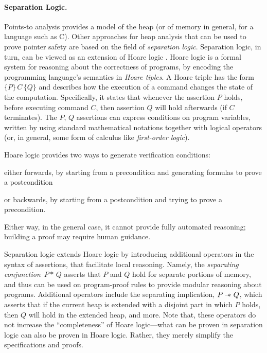 
\paragraph{Separation Logic.}
Points-to analysis provides a model of the heap (or of memory in
general, for a language such as C). Other approaches for heap analysis
that can be used to prove pointer safety are based on the field of
\emph{separation logic}. Separation logic, in turn, can be viewed as
an extension of Hoare logic
\cite{journals/cacm/Hoare69,floyd1967assigning,lics:2002/Reynolds,csl/OHearnRY01}.
Hoare logic is a formal system for reasoning about the correctness of
programs, by encoding the programming language's semantics in
\emph{Hoare tiples}. A Hoare triple has the form \(\{P\}\, C\, \{Q\}\)
and describes how the execution of a command changes the state of the
computation. Specifically, it states that whenever the assertion \(P\)
holds, before executing command \(C\), then assertion \(Q\) will hold
afterwards (if \(C\) terminates). The \(P,\, Q\) assertions can
express conditions on program variables, written by using standard
mathematical notations together with logical operators (or, in
general, some form of calculus like \emph{first-order logic}).

Hoare logic provides two ways to generate verification conditions:
\begin{inparaenum}[(i)]
\item either forwards, by starting from a precondition and
  generating formulas to prove a postcondition
\item or backwards, by starting from a postcondition and trying to
  prove a precondition.
\end{inparaenum}
Either way, in the general case, it cannot provide fully automated
reasoning; building a proof may require human guidance.


Separation logic
\cite{lics:2002/Reynolds,csl/OHearnRY01,popl/IshtiaqO01,Reynolds00intuitionisticreasoning}
extends Hoare logic by introducing additional operators in the syntax
of assertions, that facilitate local reasoning. Namely, the
\emph{separating conjunction} \(\,P * \,Q\) asserts that \(P\) and
\(Q\) hold for separate portions of memory, and thus can be used on
program-proof rules to provide modular reasoning about
programs. Additional operators include the separating implication,
\(P \sep Q\), which asserts that if the current heap is extended with
a disjoint part in which \(P\) holds, then \(Q\) will hold in the
extended heap, and more. Note that, these operators do not increase
the ``completeness'' of Hoare logic---what can be proven in separation
logic can also be proven in Hoare logic. Rather, they merely simplify
the specifications and proofs.

